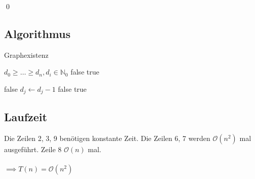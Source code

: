 \qed

\subsection{Algorithmus}
\label{sub:Algorithmus}

\begin{algorithm}
	\caption{Graphexistenz}
	\begin{algorithmic}[1]
		\Require $d_0 \ge \dots \ge d_n, d_i \in \mathbb{N}_0$
		\Statex
			 \Return false \EndIf
			 \Return true \EndIf
			\Statex

					 \Return false \EndIf
					\State $d_j \gets d_j - 1$
				\EndFor
				\Statex
				 \Return false \EndIf
			\EndFor
			\Statex
			\State \Return true
		\EndFunction
	\end{algorithmic}
\end{algorithm}

\subsection{Laufzeit}
\label{sub:Laufzeit}

Die Zeilen 2, 3, 9 benötigen konstante Zeit. Die Zeilen 6, 7 werden $\mathcal{O}(n^2)$ mal ausgeführt. Zeile 8 $\mathcal{O}(n)$ mal.\\\\
$\implies T(n) = \mathcal{O}(n^2)$


